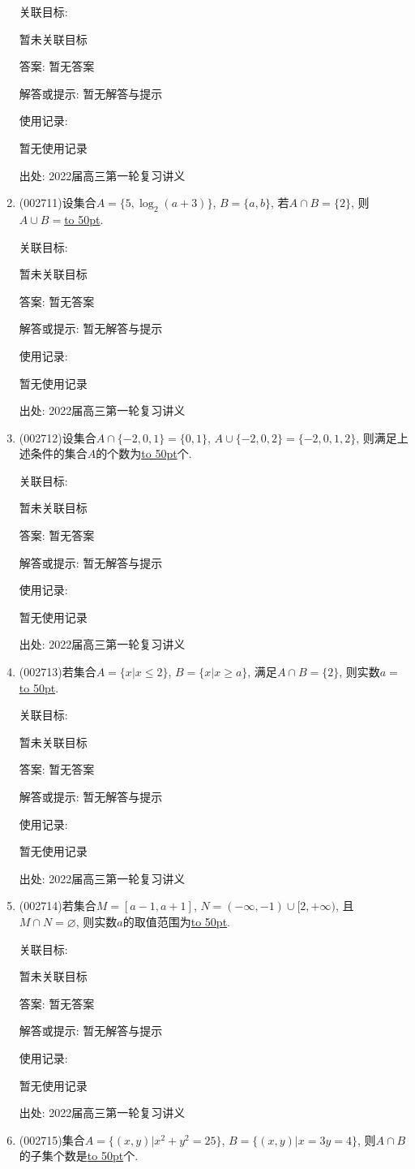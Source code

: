 \documentclass[10pt,a4paper]{article}
\newcommand{\blank}[1]{\underline{\hbox to #1pt{}}}
\begin{document}
\begin{enumerate}[1.]
关联目标:

暂未关联目标

答案: 暂无答案

解答或提示: 暂无解答与提示

使用记录:

暂无使用记录


出处: 2022届高三第一轮复习讲义
\item { (002711)}设集合$A=\{5,\log_2(a+3)\}$, $B=\{a,b\}$, 若$A\cap B=\{2\}$, 则$A\cup B=$\blank{50}.


关联目标:

暂未关联目标

答案: 暂无答案

解答或提示: 暂无解答与提示

使用记录:

暂无使用记录


出处: 2022届高三第一轮复习讲义
\item { (002712)}设集合$A\cap \{-2,0,1\}=\{0,1\}$, $A\cup \{-2,0,2\}=\{-2,0,1,2\}$, 则满足上述条件的集合$A$的个数为\blank{50}个.


关联目标:

暂未关联目标

答案: 暂无答案

解答或提示: 暂无解答与提示

使用记录:

暂无使用记录


出处: 2022届高三第一轮复习讲义
\item { (002713)}若集合$A=\{x|x\le 2\}$, $B=\{x|x\ge a\}$, 满足$A\cap B=\{2\}$, 则实数$a=$\blank{50}.


关联目标:

暂未关联目标

答案: 暂无答案

解答或提示: 暂无解答与提示

使用记录:

暂无使用记录


出处: 2022届高三第一轮复习讲义
\item { (002714)}若集合$M=[a-1,a+1]$, $N=(-\infty,-1)\cup [2,+\infty)$, 且$M\cap N=\varnothing$, 则实数$a$的取值范围为\blank{50}.


关联目标:

暂未关联目标

答案: 暂无答案

解答或提示: 暂无解答与提示

使用记录:

暂无使用记录


出处: 2022届高三第一轮复习讲义
\item { (002715)}集合$A=\{(x,y)|x^2+y^2=25\}$, $B=\{(x,y)|x=3y=4\}$, 则$A\cap B$的子集个数是\blank{50}个.



\end{enumerate}
\end{document}
